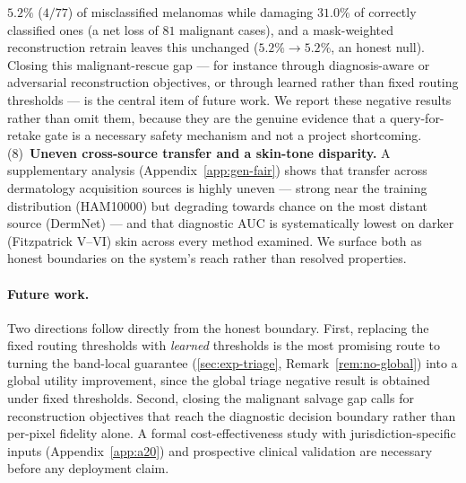 $5.2\%$ ($4/77$) of misclassified melanomas while damaging $31.0\%$ of correctly
classified ones (a net loss of $81$ malignant cases), and a mask-weighted
reconstruction retrain leaves this unchanged ($5.2\%\to5.2\%$, an honest null). Closing
this malignant-rescue gap --- for instance through diagnosis-aware or adversarial
reconstruction objectives, or through learned rather than fixed routing thresholds ---
is the central item of future work. We report these negative results rather than omit
them, because they are the genuine evidence that a query-for-retake gate is a necessary
safety mechanism and not a project shortcoming.
(8)~\textbf{Uneven cross-source transfer and a skin-tone disparity.} A supplementary
analysis (Appendix~\ref{app:gen-fair}) shows that transfer across dermatology acquisition
sources is highly uneven --- strong near the training distribution (HAM10000) but
degrading towards chance on the most distant source (DermNet) --- and that diagnostic AUC
is systematically lowest on darker (Fitzpatrick V--VI) skin across every method examined.
We surface both as honest boundaries on the system's reach rather than resolved properties.

\paragraph{Future work.}
Two directions follow directly from the honest boundary. First, replacing the
fixed routing thresholds with \emph{learned} thresholds is the most promising route to
turning the band-local guarantee (\cref{sec:exp-triage}, Remark~\ref{rem:no-global})
into a global utility improvement, since the global triage negative result is obtained
under fixed thresholds. Second, closing the malignant salvage gap calls for
reconstruction objectives that reach the diagnostic decision boundary rather than
per-pixel fidelity alone. A formal cost-effectiveness study with jurisdiction-specific
inputs (Appendix~\ref{app:a20}) and prospective clinical validation are necessary
before any deployment claim.
